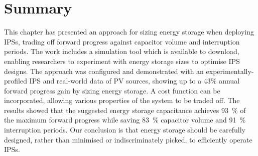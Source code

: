 \section{Summary} \label{sec:c4_summary}

This chapter has presented an approach for sizing energy storage when deploying IPSs, trading off forward progress against capacitor volume and interruption periods. 
The work includes a simulation tool which is available to download, enabling researchers to experiment with energy storage sizes to optimise IPS designs. 
The approach was configured and demonstrated with an experimentally-profiled IPS and real-world data of PV sources, showing up to a 43\% annual forward progress gain by sizing energy storage. 
A cost function can be incorporated, allowing various properties of the system to be traded off. 
The results showed that the suggested energy storage capacitance achieves \SI{93}{\percent} of the maximum forward progress while saving \SI{83}{\percent} capacitor volume and \SI{91}{\percent} interruption periods. 
Our conclusion is that energy storage should be carefully designed, rather than minimised or indiscriminately picked, to efficiently operate IPSs. 
